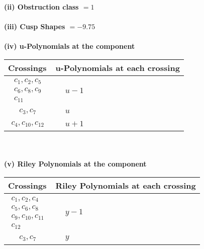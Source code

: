 \documentclass[1p]{elsarticle_modified}
\theoremstyle{definition}
\begin{document}
\flushleft \textbf{(ii) Obstruction class $= 1$}\\~\\
\flushleft \textbf{(iii) Cusp Shapes $= -9.75$}\\~\\
\newpage\renewcommand{\arraystretch}{1}
\flushleft \textbf{(iv) u-Polynomials at the component}\newline \\
\begin{tabular}{m{50pt}|m{274pt}}
Crossings & \hspace{64pt}u-Polynomials at each crossing \\
\hline $$\begin{aligned}c_{1},c_{2},c_{5}\\c_{6},c_{8},c_{9}\\c_{11}\end{aligned}$$&$\begin{aligned}
&u-1
\end{aligned}$\\
\hline $$\begin{aligned}c_{3},c_{7}\end{aligned}$$&$\begin{aligned}
&u
\end{aligned}$\\
\hline $$\begin{aligned}c_{4},c_{10},c_{12}\end{aligned}$$&$\begin{aligned}
&u+1
\end{aligned}$\\
\hline
\end{tabular}\\~\\
\newpage\renewcommand{\arraystretch}{1}
\flushleft \textbf{(v) Riley Polynomials at the component}\newline \\
\begin{tabular}{m{50pt}|m{274pt}}
Crossings & \hspace{64pt}Riley Polynomials at each crossing \\
\hline $$\begin{aligned}c_{1},c_{2},c_{4}\\c_{5},c_{6},c_{8}\\c_{9},c_{10},c_{11}\\c_{12}\end{aligned}$$&$\begin{aligned}
&y-1
\end{aligned}$\\
\hline $$\begin{aligned}c_{3},c_{7}\end{aligned}$$&$\begin{aligned}
&y
\end{aligned}$\\
\hline
\end{tabular}\\~\\
\end{document}
